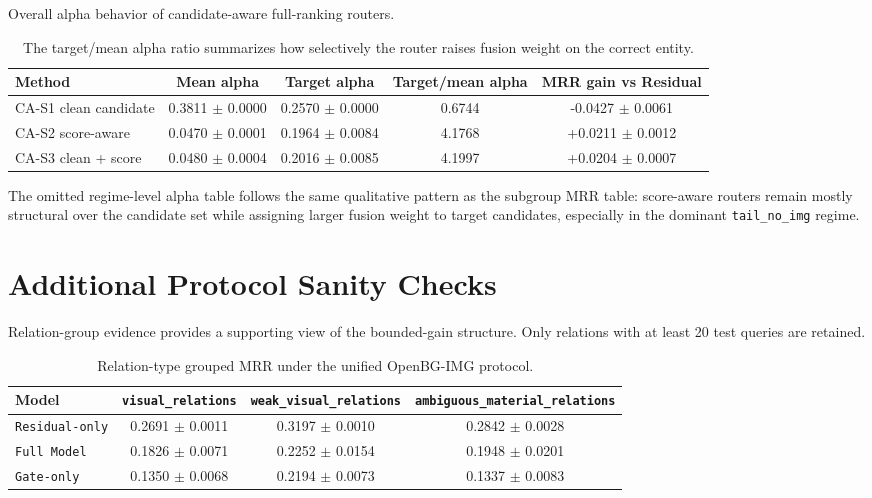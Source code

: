 \documentclass[11pt]{article}
\begin{document}
\begin{table}[H]
\centering
\small
\caption{Overall alpha behavior of candidate-aware full-ranking routers.}
\label{tab:candidate_router_alpha_overall}
\begin{tabular}{p{}cccc}
\toprule
Method & Mean alpha & Target alpha & Target/mean alpha & MRR gain vs Residual \\
\midrule
CA-S1 clean candidate & 0.3811 $\pm$ 0.0000 & 0.2570 $\pm$ 0.0000 & 0.6744 & -0.0427 $\pm$ 0.0061 \\
CA-S2 score-aware & 0.0470 $\pm$ 0.0001 & 0.1964 $\pm$ 0.0084 & 4.1768 & +0.0211 $\pm$ 0.0012 \\
CA-S3 clean + score & 0.0480 $\pm$ 0.0004 & 0.2016 $\pm$ 0.0085 & 4.1997 & +0.0204 $\pm$ 0.0007 \\
\bottomrule
\end{tabular}
\vspace{0.4ex}\caption*{\footnotesize The target/mean alpha ratio summarizes how selectively the router raises fusion weight on the correct entity.}
\end{table}

The omitted regime-level alpha table follows the same qualitative pattern as the subgroup MRR table: score-aware routers remain mostly structural over the candidate set while assigning larger fusion weight to target candidates, especially in the dominant \texttt{tail\_no\_img} regime.

\clearpage
\section{Additional Protocol Sanity Checks}
\label{app:protocol_sanity}

Relation-group evidence provides a supporting view of the bounded-gain structure. Only relations with at least 20 test queries are retained.

\begin{table}[H]
\centering
\caption{Relation-type grouped MRR under the unified OpenBG-IMG protocol.}
\label{tab:relation_grouped}
\small
\setlength{\tabcolsep}{5pt}
\begin{tabular}{lccc}
\toprule
Model & \texttt{visual\_relations} & \texttt{weak\_visual\_relations} & \texttt{ambiguous\_material\_relations} \\
\midrule
\texttt{Residual-only} & 0.2691 $\pm$ 0.0011 & 0.3197 $\pm$ 0.0010 & 0.2842 $\pm$ 0.0028 \\
\texttt{Full Model} & 0.1826 $\pm$ 0.0071 & 0.2252 $\pm$ 0.0154 & 0.1948 $\pm$ 0.0201 \\
\texttt{Gate-only} & 0.1350 $\pm$ 0.0068 & 0.2194 $\pm$ 0.0073 & 0.1337 $\pm$ 0.0083 \\
\bottomrule
\end{tabular}
\end{table}
\end{document}
